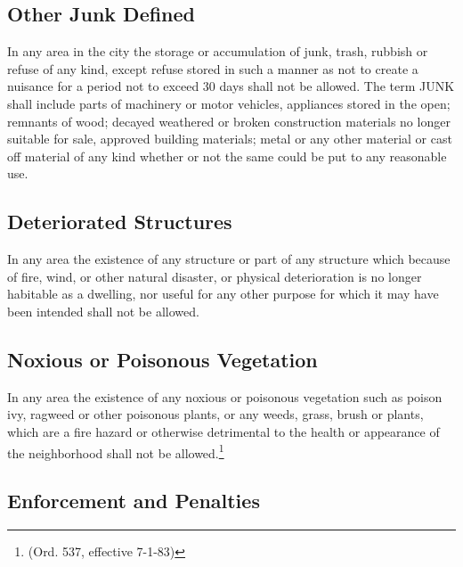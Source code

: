 \subsection{Other Junk Defined}
In any area in the city the storage or accumulation of junk, trash, rubbish or refuse of any kind, except refuse stored in such a manner as not to create a nuisance for a period not to exceed 30 days shall not be allowed. The term JUNK shall include parts of machinery or motor vehicles, appliances stored in the open; remnants of wood; decayed weathered or broken construction materials no longer suitable for sale, approved building materials; metal or any other material or cast off material of any kind whether or not the same could be put to any reasonable use.
\subsection{Deteriorated Structures}
In any area the existence of any structure or part of any structure which because of fire, wind, or other natural disaster, or physical deterioration is no longer habitable as a dwelling, nor useful for any other purpose for which it may have been intended shall not be allowed.
\subsection{Noxious or Poisonous Vegetation}
In any area the existence of any noxious or poisonous vegetation such as poison ivy, ragweed or other poisonous plants, or any weeds, grass, brush or plants, which are a fire hazard or otherwise detrimental to the health or appearance of the neighborhood shall not be allowed.\footnote{(Ord. 537, effective 7-1-83)}
\subsection{Enforcement and Penalties}
